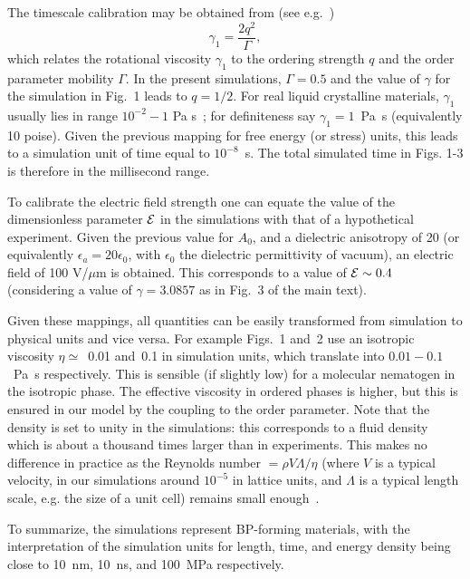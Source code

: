 \documentclass[12pt,twoside]{article}
\begin{document}
The timescale calibration may be obtained from (see e.g.~\cite{denniston})
\begin{equation}
\gamma_1=\frac{2q^2}{\Gamma},
\end{equation}
which relates the rotational viscosity $\gamma_1$ to the ordering strength
$q$ and the order parameter mobility $\Gamma$.
In the present simulations, $\Gamma = 0.5$ and the value of $\gamma$
for the simulation in Fig.~1 leads to $q=1/2$.   
For real liquid crystalline materials, $\gamma_1$ usually lies in range
$10^{-2}-1$ Pa s~\cite{deGennes}; for definiteness say
$\gamma_1 = 1$~Pa~s (equivalently 10 poise). Given the previous mapping for
free energy (or stress) units, this leads to a simulation unit of time equal
to $10^{-8}$~s. The total simulated time in Figs. 1-3 is therefore in the
millisecond range. 

To calibrate the electric field strength 
one can equate the value of the dimensionless parameter ${\cal E}$ in the 
simulations with that of a hypothetical experiment.
Given the previous value for $A_0$, and a dielectric anisotropy of 20
(or equivalently $\epsilon_a=20\epsilon_0$, with $\epsilon_0$ the
dielectric permittivity of vacuum), an electric field
of 100 V/$\mu$m is obtained. This corresponds to a value of
${\cal E}\sim 0.4$ (considering a value of $\gamma=3.0857$ as in
Fig.~3 of the main text).

Given these mappings, all quantities can be easily transformed from
simulation to physical units and vice versa. For example Figs.~1 and~2
use an isotropic viscosity $\eta \simeq$~0.01 and~0.1 in simulation units,
which translate into $0.01-0.1$~Pa~s respectively. This is sensible (if 
slightly low) for a molecular nematogen in the isotropic phase. 
The effective viscosity in ordered phases is higher, but this is ensured
in our model by the coupling to the order parameter.
Note that the density is set to unity in the simulations: this
corresponds to a fluid density which is about a thousand times larger
than in experiments. This makes no difference in practice as
the Reynolds number $= \rho V\Lambda/\eta$ (where $V$ is a typical
velocity, in our simulations around $10^{-5}$ in lattice units, 
and $\Lambda$ is a typical length scale, e.g. the size of a unit cell) 
remains small enough~\cite{codef}. 

To summarize, the simulations represent BP-forming materials, with the
interpretation of the simulation units for length, time, and energy
density being close to 10~nm, 10~ns, and 100~MPa respectively.
\end{document}
